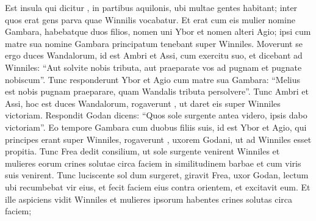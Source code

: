 \bpg\bpa[0]%
\pva Est insula qui dicitur , in partibus aquilonis, ubi multae gentes habitant; inter quos erat gens parva quae Winnilis vocabatur.
\pva Et erat cum eis mulier nomine Gambara, habebatque duos filios, nomen uni Ybor et nomen alteri Agio; ipsi cum matre sua nomine Gambara principatum tenebant super Winniles.
\pva Moverunt se ergo duces Wandalorum, id est Ambri et Assi, cum exercitu suo,
\pva et dicebant ad Winniles: “Aut solvite nobis tributa, aut praeparate vos ad pugnam et pugnate nobiscum”.
\pva Tunc responderunt Ybor et Agio cum matre sua Gambara: “Melius est nobis pugnam praeparare, quam Wandalis tributa persolvere”.
\pva Tunc Ambri et Assi, hoc est duces Wandalorum, rogaverunt , ut daret eis super Winniles victoriam.
\pva Respondit Godan dicens: “Quos sole surgente antea videro, ipsis dabo victoriam”.
\pva Eo tempore Gambara cum duobus filiis suis, id est Ybor et Agio, qui principes⁠ erant super Winniles, rogaverunt , uxorem Godani, ut ad Winniles esset propitia.
\pva Tunc Frea dedit consilium, ut sole surgente venirent Winniles et mulieres eorum crines solutae circa faciem in similitudinem barbae et cum viris suis venirent.
\pva Tunc luciscente sol dum surgeret, giravit Frea, uxor Godan, lectum ubi recumbebat vir eius, et fecit faciem eius contra orientem, et excitavit eum.
\pva Et ille aspiciens vidit Winniles et mulieres ipsorum habentes crines solutas circa faciem;
